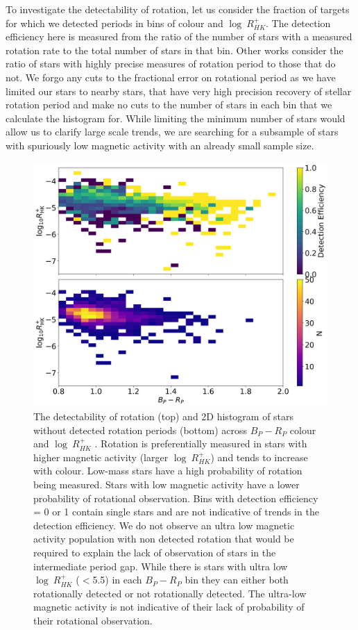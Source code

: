 To investigate the detectability of rotation, let us consider the fraction of targets for which we detected periods in bins of colour and $\log \ R^{+}_{HK}$.
The detection efficiency here is measured from the ratio of the number of stars with a measured rotation rate to the total number of stars in that bin.
Other works \citep[See e.g.]{claytor_recovery_2022} consider the ratio of stars with highly precise measures of rotation period to those that do not.
We forgo any cuts to the fractional error on rotational period as we have limited our stars to nearby stars, that have very high precision recovery of stellar rotation period and make no cuts to the number of stars in each bin that we calculate the histogram for. 
While limiting the minimum number of stars would allow us to clarify large scale trends, we are searching for a subsample of stars with spuriously low magnetic activity with an already small sample size.

\begin{figure}
\centering
    \includegraphics[width=\textwidth]{Figures/rot_gap_figures/detection_efficiency.png}
    \caption{
    	The detectability of rotation (top) and 2D histogram of stars without detected rotation periods (bottom) across \gaia{} $B_P - R_P$ colour and $\log \ R^{+}_{HK}$ . 
	Rotation is preferentially measured in stars with higher magnetic activity (larger $\log \ R^{+}_{HK}$) and tends to increase with colour. Low-mass stars have a high probability of rotation being measured. Stars with low magnetic activity have a lower probability of rotational observation. Bins with detection efficiency = 0 or 1 contain single stars and are not indicative of trends in the detection efficiency.
	We do not observe an ultra low magnetic activity population with non detected rotation that would be required to explain the lack of observation of stars in the intermediate period gap.
	While there is stars with ultra low $\log \ R^{+}_{HK}$  ($<$5.5) in each $B_P-R_P$ bin they can either both rotationally detected or not rotationally detected. The ultra-low magnetic activity is not indicative of their lack of probability of their rotational observation.
}
    \label{fig:detection_efficiency_rhk}
\end{figure}

